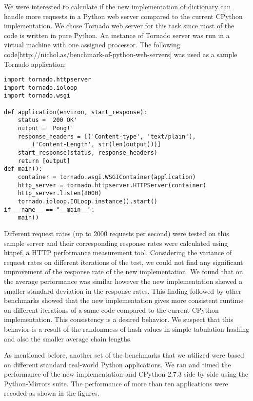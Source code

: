 \documentclass[11pt]{article}
\begin{document}
We were interested to calculate if the new implementation of dictionary can handle more requests in a Python web server compared to the current CPython implementation. We chose Tornado web server for this task since most of the code is written in pure Python. An instance of Tornado server was run in a virtual machine with one assigned processor. The following code[http://nichol.as/benchmark-of-python-web-servers] was used as a sample Tornado application:
 \begin{verbatim}
import tornado.httpserver
import tornado.ioloop
import tornado.wsgi

def application(environ, start_response):
    status = '200 OK'
    output = 'Pong!' 
    response_headers = [('Content-type', 'text/plain'),
        ('Content-Length', str(len(output)))]
    start_response(status, response_headers)
    return [output]
def main():
    container = tornado.wsgi.WSGIContainer(application)
    http_server = tornado.httpserver.HTTPServer(container)
    http_server.listen(8000)
    tornado.ioloop.IOLoop.instance().start()
if __name__ == "__main__":
    main()
 \end{verbatim}

Different request rates (up to 2000 requests per second) were tested on this sample server and their corresponding response rates were calculated using httpef, a HTTP performance measurement tool. Considering the variance of request rates on different iterations of the test, we could not find any significant improvement of the response rate of the new implementation. We found that on the average performance was similar however the new implementation showed a smaller standard deviation in the response rates. This finding followed by other benchmarks showed that the new implementation gives more consistent runtime on different iterations of a same code compared to the current CPython implementation. This consistency is a desired behavior. We suspect that this behavior is a result of the randomness of hash values in simple tabulation hashing and also the smaller average chain lengths.

As mentioned before, another set of the benchmarks that we utilized were based on different standard real-world Python applications. We ran and timed the performance of the new implementation and CPython 2.7.3 side by side using the Python-Mirrors suite. The performance of more than ten applications were recoded as shown in the figures.

\end{document}
